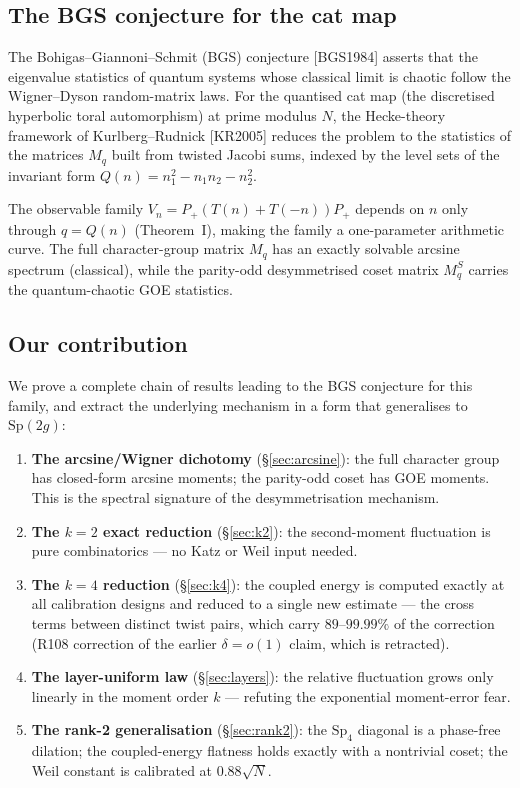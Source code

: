 \documentclass[11pt]{article}
\begin{document}
\subsection{The BGS conjecture for the cat map}

The Bohigas--Giannoni--Schmit (BGS) conjecture [BGS1984] asserts that
the eigenvalue statistics of quantum systems whose classical limit is
chaotic follow the Wigner--Dyson random-matrix laws.  For the
quantised cat map (the discretised hyperbolic toral automorphism) at
prime modulus $N$, the Hecke-theory framework of
Kurlberg--Rudnick [KR2005] reduces the problem to the statistics of
the matrices $M_q$ built from twisted Jacobi sums, indexed by the
level sets of the invariant form
$Q(n) = n_1^2 - n_1 n_2 - n_2^2$.

The observable family $V_n = P_+(T(n) + T(-n))P_+$ depends on $n$
only through $q = Q(n)$ (Theorem~I), making the family a
one-parameter arithmetic curve.  The full character-group matrix $M_q$
has an exactly solvable arcsine spectrum (classical), while the
parity-odd desymmetrised coset matrix $M_q^S$ carries the
quantum-chaotic GOE statistics.

\subsection{Our contribution}

We prove a complete chain of results leading to the BGS conjecture
for this family, and extract the underlying mechanism in a form that
generalises to $\mathrm{Sp}(2g)$:

\begin{enumerate}
\item \textbf{The arcsine/Wigner dichotomy} (\S\ref{sec:arcsine}):
the full character group has closed-form arcsine moments; the
parity-odd coset has GOE moments.  This is the spectral signature of
the desymmetrisation mechanism.
\item \textbf{The $k{=}2$ exact reduction} (\S\ref{sec:k2}): the
second-moment fluctuation is pure combinatorics — no Katz or Weil
input needed.
\item \textbf{The $k{=}4$ reduction} (\S\ref{sec:k4}): the coupled
energy is computed exactly at all calibration designs and reduced to a
single new estimate --- the cross terms between distinct twist pairs,
which carry $89$--$99.99\%$ of the correction (R108 correction of the
earlier $\delta = o(1)$ claim, which is retracted).
\item \textbf{The layer-uniform law} (\S\ref{sec:layers}): the
relative fluctuation grows only linearly in the moment order $k$ —
refuting the exponential moment-error fear.
\item \textbf{The rank-2 generalisation} (\S\ref{sec:rank2}): the
$\mathrm{Sp}_4$ diagonal is a phase-free dilation; the coupled-energy
flatness holds exactly with a nontrivial coset; the Weil constant is
calibrated at $0.88\sqrt{N}$.
\end{enumerate}
\end{document}
